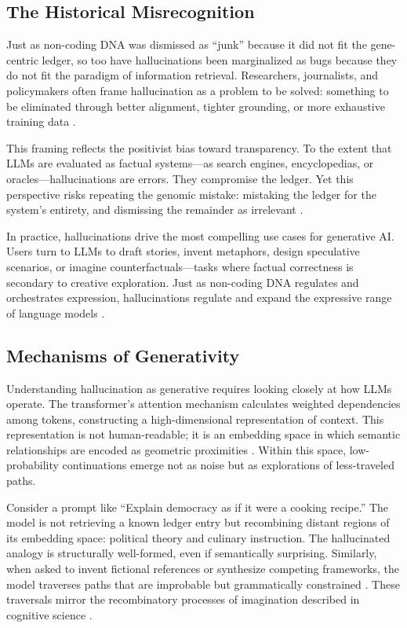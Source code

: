 \documentclass[12pt]{article}
\begin{document}
\subsection{The Historical Misrecognition}
Just as non-coding DNA was dismissed as ``junk'' because it did not fit the gene-centric ledger, so too have hallucinations been marginalized as bugs because they do not fit the paradigm of information retrieval. Researchers, journalists, and policymakers often frame hallucination as a problem to be solved: something to be eliminated through better alignment, tighter grounding, or more exhaustive training data \citep{bender2021, marcus2022}.

This framing reflects the positivist bias toward transparency. To the extent that LLMs are evaluated as factual systems---as search engines, encyclopedias, or oracles---hallucinations are errors. They compromise the ledger. Yet this perspective risks repeating the genomic mistake: mistaking the ledger for the system’s entirety, and dismissing the remainder as irrelevant \citep{keller2000}.

In practice, hallucinations drive the most compelling use cases for generative AI. Users turn to LLMs to draft stories, invent metaphors, design speculative scenarios, or imagine counterfactuals---tasks where factual correctness is secondary to creative exploration. Just as non-coding DNA regulates and orchestrates expression, hallucinations regulate and expand the expressive range of language models \citep{barad2007}.

\subsection{Mechanisms of Generativity}
Understanding hallucination as generative requires looking closely at how LLMs operate. The transformer’s attention mechanism calculates weighted dependencies among tokens, constructing a high-dimensional representation of context. This representation is not human-readable; it is an embedding space in which semantic relationships are encoded as geometric proximities \citep{vaswani2017}. Within this space, low-probability continuations emerge not as noise but as explorations of less-traveled paths.

Consider a prompt like ``Explain democracy as if it were a cooking recipe.'' The model is not retrieving a known ledger entry but recombining distant regions of its embedding space: political theory and culinary instruction. The hallucinated analogy is structurally well-formed, even if semantically surprising. Similarly, when asked to invent fictional references or synthesize competing frameworks, the model traverses paths that are improbable but grammatically constrained \citep{shanahan2023}. These traversals mirror the recombinatory processes of imagination described in cognitive science \citep{hofstadter1995}.
\end{document}
